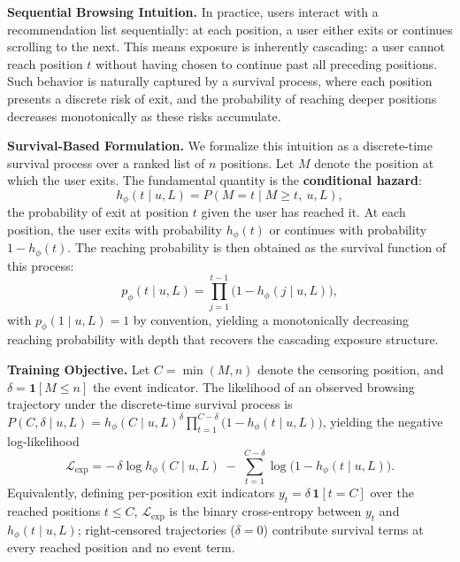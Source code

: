 \documentclass[sigconf]{acmart}
\begin{document}
\vspace{0.5em}
\noindent\textbf{Sequential Browsing Intuition.}
In practice, users interact with a recommendation list sequentially: at each position, a user either exits or continues scrolling to the next. This means exposure is inherently cascading: a user cannot reach position $t$ without having chosen to continue past all preceding positions. Such behavior is naturally captured by a survival process, where each position presents a discrete risk of exit, and the probability of reaching deeper positions decreases monotonically as these risks accumulate.

\vspace{0.5em}
\noindent\textbf{Survival-Based Formulation.}
We formalize this intuition as a discrete-time survival process over a ranked list of $n$ positions. Let $M$ denote the position at which the user exits. The fundamental quantity is the \textbf{conditional hazard}:
\begin{equation}
    h_\phi(t \mid u, L) = P(M = t \mid M \geq t,\ u, L),
\end{equation}
the probability of exit at position $t$ given the user has reached it. At each position, the user exits with probability $h_\phi(t)$ or continues with probability $1 - h_\phi(t)$. The reaching probability is then obtained as the survival function of this process:
\begin{equation}
\label{eq:reaching_prob}
    p_\phi(t \mid u, L) = \prod_{j=1}^{t-1}\bigl(1 - h_\phi(j \mid u, L)\bigr),
\end{equation}
with $p_\phi(1 \mid u, L) = 1$ by convention, yielding a monotonically decreasing reaching probability with depth that recovers the cascading exposure structure.

\vspace{0.5em}
\noindent\textbf{Training Objective.}
Let $C = \min(M, n)$ denote the censoring position, and $\delta = \mathbf{1}[M \le n]$ the event indicator. The likelihood of an observed browsing trajectory under the discrete-time survival process is $P(C, \delta \mid u, L) = h_\phi(C \mid u, L)^{\delta} \prod_{t=1}^{C-\delta} \bigl(1 - h_\phi(t \mid u, L)\bigr)$, yielding the negative log-likelihood
\begin{equation}
\mathcal{L}_{\text{exp}} = -\,\delta \log h_\phi(C \mid u, L) \;-\; \sum_{t=1}^{C-\delta} \log\bigl(1 - h_\phi(t \mid u, L)\bigr).
\end{equation}
Equivalently, defining per-position exit indicators $y_t = \delta\,\mathbf{1}[t = C]$ over the reached positions $t \le C$, $\mathcal{L}_{\text{exp}}$ is the binary cross-entropy between $y_t$ and $h_\phi(t \mid u, L)$; right-censored trajectories ($\delta = 0$) contribute survival terms at every reached position and no event term.
\end{document}
